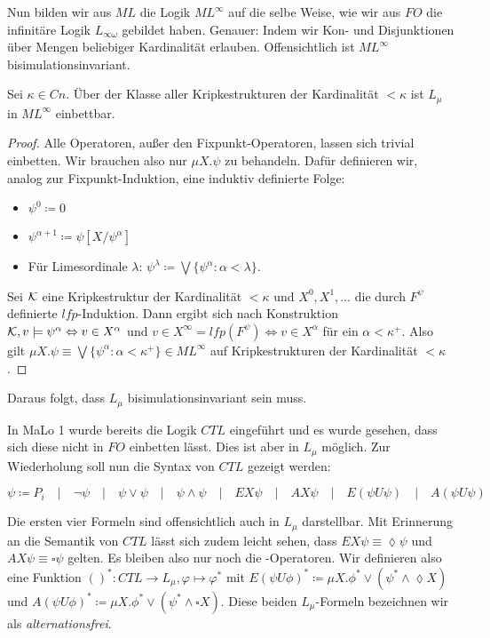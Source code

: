 Nun bilden wir aus $ML$ die Logik $ML^\infty$ auf die selbe Weise, wie wir aus $FO$ die infinitäre Logik $L_{\infty\omega}$ gebildet haben. Genauer: Indem wir Kon- und Disjunktionen über Mengen beliebiger Kardinalität erlauben. Offensichtlich ist $ML^\infty$ bisimulationsinvariant.

\begin{satz}
	Sei $\kappa\in Cn$. Über der Klasse aller Kripkestrukturen der Kardinalität $< \kappa$ ist $L_\mu$ in $ML^\infty$ einbettbar.
\end{satz}
\begin{proof}
	Alle Operatoren, außer den Fixpunkt-Operatoren, lassen sich trivial einbetten. Wir brauchen also nur $\mu X .\psi$ zu behandeln. Dafür definieren wir, analog zur Fixpunkt-Induktion, eine induktiv definierte Folge:
	\begin{itemize}
		\item $\psi^0\coloneqq 0$
		\item $\psi^{\alpha+1} \coloneqq \psi[X/\psi^\alpha]$
		\item Für Limesordinale $\lambda$: $\psi^\lambda\coloneqq \bigvee\{\psi^\alpha : \alpha < \lambda\}$.
	\end{itemize}
	Sei $\mathcal{K}$ eine Kripkestruktur der Kardinalität $<\kappa$ und $X^0,X^1,\dots$ die durch $F^\psi$ definierte $lfp$-Induktion. Dann ergibt sich nach Konstruktion $\mathcal{K},v\models \psi^\alpha \Leftrightarrow v\in X^\alpha$ und $v\in X^\infty=lfp(F^\psi)\Leftrightarrow v\in X^\alpha$ für ein $\alpha<\kappa^+$. Also gilt $\mu X.\psi \equiv \bigvee\{\psi^\alpha : \alpha < \kappa^+\}\in ML^\infty$ auf Kripkestrukturen der Kardinalität $<\kappa$.
\end{proof}

Daraus folgt, dass $L_\mu$ bisimulationsinvariant sein muss.

In MaLo 1 wurde bereits die Logik $CTL$ eingeführt und es wurde gesehen, dass sich diese nicht in $FO$ einbetten lässt. Dies ist aber in $L_\mu$ möglich. Zur Wiederholung soll nun die Syntax von $CTL$ gezeigt werden:

\[\psi \coloneqq P_i \quad\vert\quad \neg\psi \quad\vert\quad \psi \lor \psi \quad\vert\quad \psi\land\psi \quad\vert\quad EX\psi \quad\vert\quad AX\psi \quad\vert\quad E(\psi U \psi) \quad\vert\quad A(\psi U \psi)\]

Die ersten vier Formeln sind offensichtlich auch in $L_\mu$ darstellbar. Mit Erinnerung an die Semantik von $CTL$ lässt sich zudem leicht sehen, dass $EX\psi \equiv \lozenge\psi$ und $AX\psi \equiv \square\psi$ gelten. Es bleiben also nur noch die -Operatoren. Wir definieren also eine Funktion $()^\ast: CTL\to L_\mu, \varphi\mapsto \varphi^\ast$ mit $E(\psi U \phi)^\ast \coloneqq \mu X . \phi^\ast \lor (\psi^\ast \land \lozenge X)$ und $A(\psi U \phi)^\ast \coloneqq \mu X . \phi^\ast \lor (\psi^\ast \land \square X)$. Diese beiden $L_\mu$-Formeln bezeichnen wir als \textit{alternationsfrei}.


